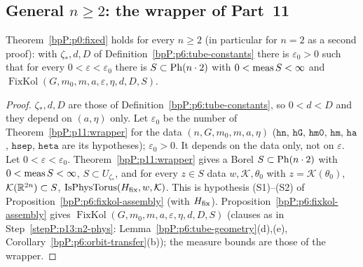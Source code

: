 \subsection{General $n\ge2$: the wrapper of Part~11}\label{bpP:p13:sec-ngen}

\begin{theorem}\label{bpP:p13:n-general}
Theorem~\ref{bpP:p0:fixed} holds for every $n\ge2$ (in particular for $n=2$ as a second proof): with $\zeta_*,d,D$ of Definition~\ref{bpP:p6:tube-constants} there is $\varepsilon_0>0$ such that for every $0<\varepsilon<\varepsilon_0$ there is $S\subset\mathrm{Ph}(n\cdot2)$ with $0<\operatorname{meas} S<\infty$ and $\operatorname{FixKol}(G,m_0,m,a,\varepsilon,\eta,d,D,S)$.
\end{theorem}
\begin{proof}
\label{stepP:p13:ng-const} $\zeta_*,d,D$ are those of Definition~\ref{bpP:p6:tube-constants}, so $0<d<D$ and they depend on $(a,\eta)$ only. Let $\varepsilon_0$ be the number of Theorem~\ref{bpP:p11:wrapper} for the data $(n,G,m_0,m,a,\eta)$ ($\texttt{hn}$, $\texttt{hG}$, $\texttt{hm0}$, $\texttt{hm}$, $\texttt{ha}$, $\texttt{hsep}$, $\texttt{heta}$ are its hypotheses); $\varepsilon_0>0$. It depends on the data only, not on $\varepsilon$.
\label{stepP:p13:ng-wrap} Let $0<\varepsilon<\varepsilon_0$. Theorem~\ref{bpP:p11:wrapper} gives a Borel $S\subset\mathrm{Ph}(n\cdot2)$ with $0<\operatorname{meas} S<\infty$, $S\subset U_{\zeta_*}$, and for every $z\in S$ data $w,\mathcal K,\theta_0$ with $z=\mathcal K(\theta_0)$, $\mathcal K(\mathbb{R}^{2n})\subset S$, $\operatorname{IsPhysTorus}(H_{\rm fix},w,\mathcal K)$. This is hypothesis (S1)--(S2) of Proposition~\ref{bpP:p6:fixkol-assembly} (with $H_{\rm fix}$).
\label{stepP:p13:ng-phys} Proposition~\ref{bpP:p6:fixkol-assembly} gives $\operatorname{FixKol}(G,m_0,m,a,\varepsilon,\eta,d,D,S)$ (clauses as in Step~\ref{stepP:p13:n2-phys}: Lemma~\ref{bpP:p6:tube-geometry}(d),(e), Corollary~\ref{bpP:p6:orbit-transfer}(b)); the measure bounds are those of the wrapper.
\end{proof}

